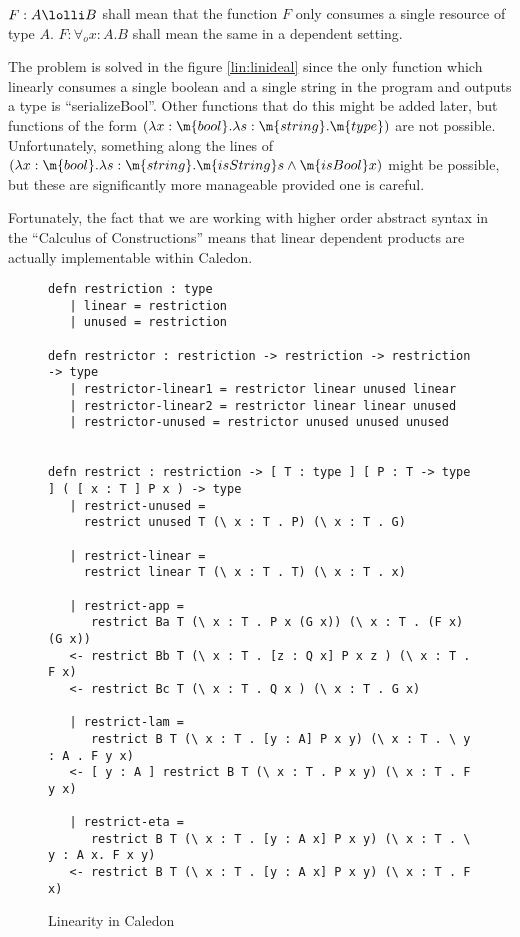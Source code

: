 $F : A \lolli B$ shall mean that the function $F$ only consumes a single resource of type $A$.  
$F : \forall_o x : A . B$ shall mean the same in a dependent setting.


The problem is solved in the figure \ref{lin:linideal} since the only function which linearly 
consumes a single boolean and a single string in the program and outputs a type is ``serializeBool''.  
Other functions that do this might be added later, but functions of the form 
$(\lambda x : \m{bool}. \lambda s : \m{string} . \m{type})$ are not possible.  
Unfortunately, something along the lines of 
$(\lambda x : \m{bool}. \lambda s : \m{string} . \m{isString} s \wedge \m{isBool} x)$ might be possible, 
but these are significantly more manageable provided one is careful.  

Fortunately, the fact that we are working with higher order abstract syntax in the ``Calculus of Constructions''
means that linear dependent products are actually implementable within Caledon.


\begin{figure}[H]
\begin{lstlisting}
defn restriction : type
   | linear = restriction
   | unused = restriction

defn restrictor : restriction -> restriction -> restriction -> type
   | restrictor-linear1 = restrictor linear unused linear
   | restrictor-linear2 = restrictor linear linear unused 
   | restrictor-unused = restrictor unused unused unused


defn restrict : restriction -> [ T : type ] [ P : T -> type ] ( [ x : T ] P x ) -> type
   | restrict-unused = 
     restrict unused T (\ x : T . P) (\ x : T . G)

   | restrict-linear = 
     restrict linear T (\ x : T . T) (\ x : T . x)

   | restrict-app = 
      restrict Ba T (\ x : T . P x (G x)) (\ x : T . (F x) (G x))
   <- restrict Bb T (\ x : T . [z : Q x] P x z ) (\ x : T . F x)
   <- restrict Bc T (\ x : T . Q x ) (\ x : T . G x)

   | restrict-lam = 
      restrict B T (\ x : T . [y : A] P x y) (\ x : T . \ y : A . F y x)
   <- [ y : A ] restrict B T (\ x : T . P x y) (\ x : T . F y x)

   | restrict-eta = 
      restrict B T (\ x : T . [y : A x] P x y) (\ x : T . \ y : A x. F x y)
   <- restrict B T (\ x : T . [y : A x] P x y) (\ x : T . F x)
\end{lstlisting}
\caption{Linearity in Caledon}
\label{lin:linimp}
\end{figure}

